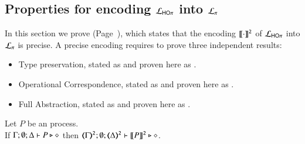 

\subsection{Properties for encoding $\mathcal{L}_{\mathsf{HO}\pi}$ into $\mathcal{L}_{\pi}$}
\label{app:enc:HOp_to_sessp}

In this section we prove  (Page~\pageref{f:enc:hotopi}), which 
states that the encoding $\llbracket\cdot\rrbracket^\mathtt{2}$ of 
$\mathcal{L}_{\mathsf{HO}\pi}$ into $\mathcal{L}_{\pi}$ is precise.
A precise encoding requires to prove three independent results:
\begin{itemize}
	\item	Type preservation, stated as  and proven here as
	.
	\item	Operational Correspondence, stated as  
	and proven here as .
	\item	Full Abstraction, stated as  and proven here 
	as .
\end{itemize}


\begin{proposition}\rm
	\label{app:prop:typepres_HOp_to_p}
	Let $P$ be an \HOp process. \\
	If $\Gamma; \emptyset; \Delta \vdash P \triangleright \diamond$ then 
	$\tmap{\Gamma}{2}; \emptyset; \tmap{\Delta}{2} \proves \pmap{P}{2} \hastype \Proc$.
\end{proposition}



